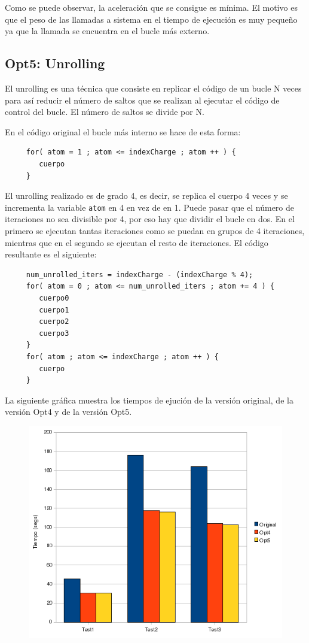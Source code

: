 Como se puede observar, la aceleraci\'{o}n que se consigue es m\'{i}nima. El
motivo es que el peso de las llamadas a sistema en el tiempo de ejecuci\'{o}n
es muy peque\~{n}o ya que la llamada se encuentra en el bucle m\'{a}s externo.

\subsection{Opt5: Unrolling}

El unrolling es una t\'{e}cnica que consiste en replicar el c\'{o}digo de un
bucle N veces para as\'{i} reducir el n\'{u}mero de saltos que se realizan al
ejecutar el c\'{o}digo de control del bucle. El n\'{u}mero de saltos se divide
por N.

En el c\'{o}digo original el bucle m\'{a}s interno se hace de esta forma:

\begin{lstlisting}
     for( atom = 1 ; atom <= indexCharge ; atom ++ ) {
        cuerpo
     }
\end{lstlisting}

El unrolling realizado es de grado 4, es decir, se replica el cuerpo 4 veces y
se incrementa la variable \texttt{atom} en 4 en vez de en 1. Puede pasar que el
n\'{u}mero de iteraciones no sea divisible por 4, por eso hay que dividir el
bucle en dos. En el primero se ejecutan tantas iteraciones como se puedan en
grupos de 4 iteraciones, mientras que en el segundo se ejecutan el resto de
iteraciones. El c\'{o}digo resultante es el siguiente:

\begin{lstlisting}
     num_unrolled_iters = indexCharge - (indexCharge % 4);
     for( atom = 0 ; atom <= num_unrolled_iters ; atom += 4 ) {
        cuerpo0
        cuerpo1
        cuerpo2
        cuerpo3
     }
     for( atom ; atom <= indexCharge ; atom ++ ) {
        cuerpo
     }
\end{lstlisting}

La siguiente gr\'{a}fica muestra los tiempos de ejuci\'{o}n de la versi\'{o}n
original, de la versi\'{o}n Opt4 y de la versi\'{o}n Opt5.

\begin{figure}[ht]
   \centering
   \includegraphics[keepaspectratio=true,width=.5\textwidth]{figures/opt5-perf}
\end{figure}

